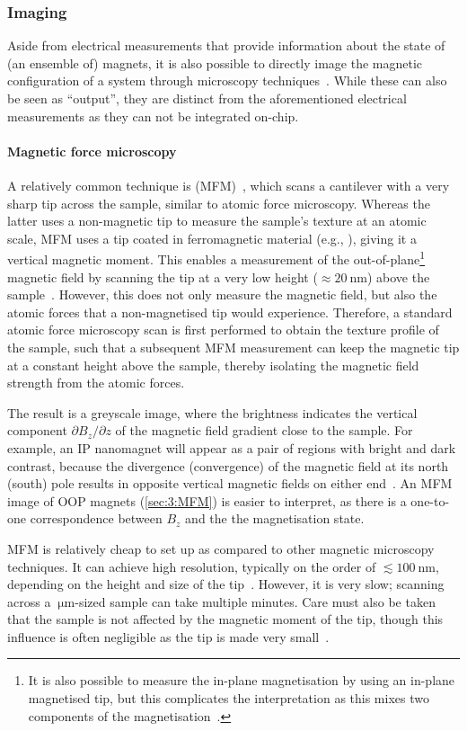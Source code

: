 \subsubsection{Imaging}
Aside from electrical measurements that provide information about the state of (an ensemble of) magnets, it is also possible to directly image the magnetic configuration of a system through microscopy techniques~\cite{freeman2001advances}.
While these can also be seen as ``output'', they are distinct from the aforementioned electrical measurements as they can not be integrated on-chip.

\paragraph{Magnetic force microscopy}
A relatively common technique is  (MFM)~\cite{MFM}, which scans a cantilever with a very sharp tip across the sample, similar to atomic force microscopy.
Whereas the latter uses a non-magnetic tip to measure the sample's texture at an atomic scale, MFM uses a tip coated in ferromagnetic material (e.g., ), giving it a vertical magnetic moment.
This enables a measurement of the out-of-plane\footnote{
	It is also possible to measure the in-plane magnetisation by using an in-plane magnetised tip, but this complicates the interpretation as this mixes two components of the magnetisation~\cite{MFM_inplane}.
} magnetic field by scanning the tip at a very low height ($\approx \SI{20}{\nano\metre}$) above the sample~\cite{NML_Carlton,JM_Masterproef}.
However, this does not only measure the magnetic field, but also the atomic forces that a non-magnetised tip would experience.
Therefore, a standard atomic force microscopy scan is first performed to obtain the texture profile of the sample, such that a subsequent MFM measurement can keep the magnetic tip at a constant height above the sample, thereby isolating the magnetic field strength from the atomic forces. \par
The result is a greyscale image, where the brightness indicates the vertical component $\partial B_z/ \partial z$ of the magnetic field gradient close to the sample.
For example, an IP nanomagnet will appear as a pair of regions with bright and dark contrast, because the divergence (convergence) of the magnetic field at its north (south) pole results in opposite vertical magnetic fields on either end~\cite{NML_Carlton}.
An MFM image of OOP magnets (\cref{sec:3:MFM}) is easier to interpret, as there is a one-to-one correspondence between $B_z$ and the the magnetisation state. \par
MFM is relatively cheap to set up as compared to other magnetic microscopy techniques.
It can achieve high resolution, typically on the order of $\lesssim \SI{100}{\nano\metre}$, depending on the height and size of the tip~\cite{MFM}.
However, it is very slow; scanning across a $\SI{}{\micro\metre}$-sized sample can take multiple minutes.
Care must also be taken that the sample is not affected by the magnetic moment of the tip, though this influence is often negligible as the tip is made very small~\cite{Probing_MagnetoOptics}.

